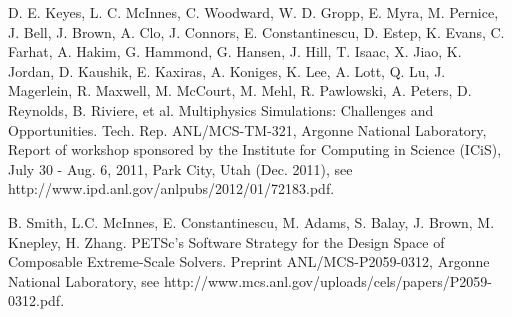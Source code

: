 
\begin{thebibliography}{10}

{\sc D. E. Keyes, L. C. McInnes, C. Woodward, W. D. Gropp, E. Myra, M. Pernice, J. Bell, J. Brown, A. Clo, J. Connors,  E. Constantinescu, D. Estep, K. Evans, C. Farhat, A. Hakim, G. Hammond, G. Hansen, J. Hill, T. Isaac, X. Jiao, K. Jordan, D. Kaushik, E. Kaxiras, A. Koniges, K. Lee, A. Lott, Q. Lu, J. Magerlein, R. Maxwell, M. McCourt, M. Mehl, R. Pawlowski, A. Peters, D. Reynolds, B. Riviere, et al.} {Multiphysics Simulations: Challenges and Opportunities}. Tech. Rep. ANL/MCS-TM-321, Argonne National Laboratory, Report of workshop sponsored by the Institute for Computing in Science (ICiS), July 30 - Aug. 6, 2011, Park City, Utah (Dec. 2011), see http://www.ipd.anl.gov/anlpubs/2012/01/72183.pdf.



{\sc B. Smith, L.C. McInnes, E. Constantinescu, M. Adams, S. Balay, J. Brown, M. Knepley, H. Zhang}. {PETSc's Software Strategy for the Design Space of Composable Extreme-Scale Solvers}. Preprint ANL/MCS-P2059-0312, Argonne National Laboratory, see http://www.mcs.anl.gov/uploads/cels/papers/P2059-0312.pdf.

\end{thebibliography}
